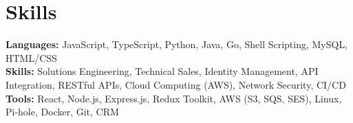 \documentclass[11pt]{article}       %
\begin{document}
\section*{Skills}
\textbf{Languages:} JavaScript, TypeScript, Python, Java, Go, Shell Scripting, MySQL, HTML/CSS\\
\textbf{Skills:} Solutions Engineering, Technical Sales, Identity Management, API Integration, RESTful APIs, Cloud Computing (AWS), Network Security, CI/CD\\
\textbf{Tools:} React, Node.js, Express.js, Redux Toolkit, AWS (S3, SQS, SES), Linux, Pi-hole, Docker, Git, CRM\\

\vspace{-6.5pt}
\end{document}
